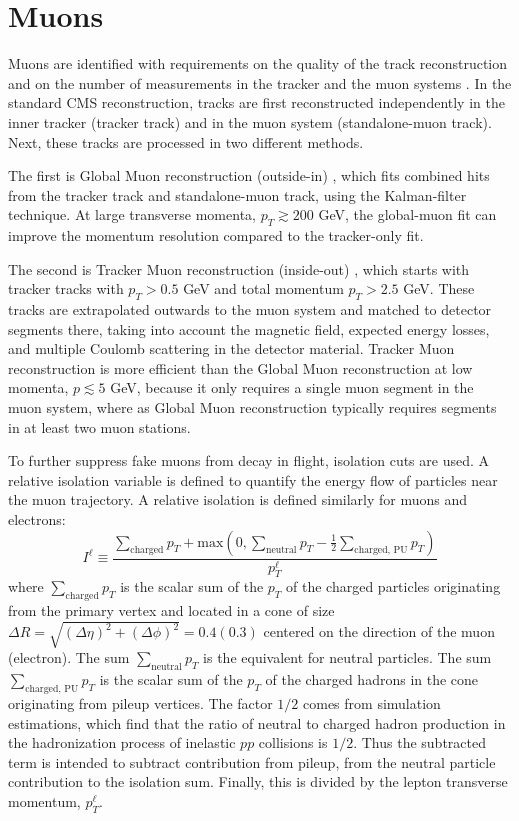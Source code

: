 \section{Muons}
Muons are identified with requirements on the quality of the track reconstruction and on the number of measurements in the tracker and the muon systems \citep{CMS-MUO-10-004}. In the standard CMS reconstruction, tracks are first reconstructed independently in the inner tracker (tracker track) and in the muon system (standalone-muon track). Next, these tracks are processed in two different methods.

The first is Global Muon reconstruction (outside-in) \citep{CMS-MUO-10-004}, which fits combined hits from the tracker track and standalone-muon track, using the Kalman-filter technique. At large transverse momenta, $p_{T} \gtrsim 200$ GeV, the global-muon fit can improve the momentum resolution compared to the tracker-only fit. 

The second is Tracker Muon reconstruction (inside-out) \citep{CMS-MUO-10-004}, which starts with tracker tracks with $p_{T} > 0.5$ GeV and total momentum $p_{T} > 2.5$ GeV. These tracks are extrapolated outwards to the muon system and matched to detector segments there, taking into account the magnetic field, expected energy losses, and multiple Coulomb scattering in the detector material. Tracker Muon reconstruction is more efficient than the Global Muon reconstruction at low momenta, $p \lesssim 5$ GeV, because it only requires a single muon segment in the muon system, where as Global Muon reconstruction typically requires segments in at least two muon stations.

To further suppress fake muons from decay in flight, isolation cuts are used. A relative isolation variable is defined to quantify the energy flow of particles near the muon trajectory.
A relative isolation is defined similarly for muons and electrons:
\begin{equation}
    I^\ell \equiv \frac{\sum_{\text{charged}} p_{T} + \text{max}\left( 0, \sum_{\text{neutral}} p_{T} - \frac{1}{2}  \sum_{\text{charged, PU}} p_{T}  \right)}{p_{T}^\ell}
    \label{eqn:definition-relative-isolation}
\end{equation}
where $\sum_{\text{charged}} p_{T}$ is the scalar sum of the $p_{T}$ of the charged particles originating from the primary vertex and located in a cone of size $\Delta R = \sqrt{(\Delta \eta)^2 + (\Delta \phi)^2} = 0.4 (0.3)$ centered on the direction of the muon (electron). The sum $\sum_{\text{neutral}} p_{T}$ is the equivalent for neutral particles. The sum $\sum_{\text{charged, PU}} p_{T}$ is the scalar sum of the $p_{T}$ of the charged hadrons in the cone originating from pileup vertices. The factor $1/2$ comes from simulation estimations, which find that the ratio of neutral to charged hadron production in the hadronization process of inelastic $pp$ collisions is $1/2$. Thus the subtracted term is intended to subtract contribution from pileup, from the neutral particle contribution to the isolation sum. Finally, this is divided by the lepton transverse momentum, $p_{T}^\ell$. 


